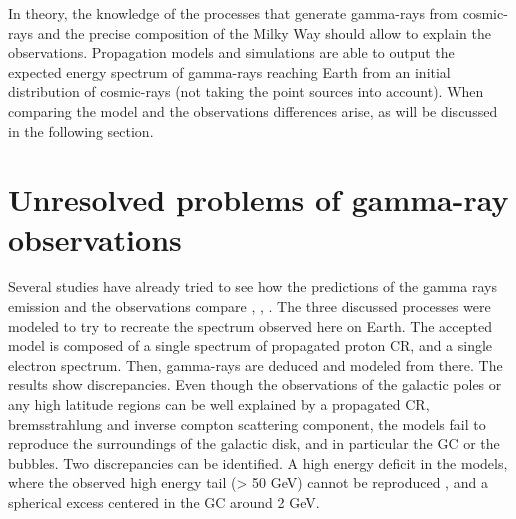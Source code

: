 

In theory, the knowledge of the processes that generate gamma-rays from cosmic-rays and the precise composition of the Milky Way should allow to explain the observations. Propagation models and simulations are able to output the expected energy spectrum of gamma-rays reaching Earth from an initial distribution of cosmic-rays (not taking the point sources into account). When comparing the model and the observations differences arise, as will be discussed in the following section.


\newpage
\section{Unresolved problems of gamma-ray observations}


%
%
%

Several studies have already tried to see how the predictions of the gamma rays emission and the observations compare \cite{Calore2015}, \cite{Fermi2017}, \cite{Yang2016}. The three discussed processes were modeled to try to recreate the spectrum observed here on Earth. The accepted model is composed of a single spectrum of propagated proton CR, and a single electron spectrum. Then, gamma-rays are deduced and modeled from there. The results show discrepancies.
Even though the observations of the galactic poles or any high latitude regions can be well explained by a propagated CR, bremsstrahlung and inverse compton scattering component, the models fail to reproduce the surroundings of the galactic disk, and in particular the GC or the bubbles. 
Two discrepancies can be identified. A high energy deficit in the models, where the observed high energy tail (> 50 GeV) cannot be reproduced \cite{Yang2016}, and a spherical excess centered in the GC around 2 GeV.

